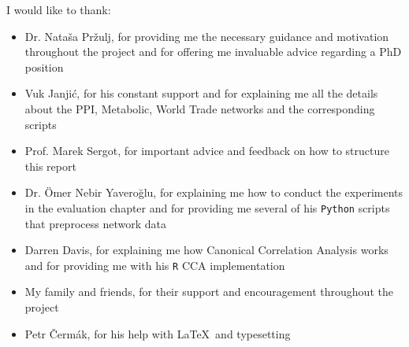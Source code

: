 \documentclass[11pt,a4paper,oneside]{book}
\theoremstyle{definition}
\theoremstyle{definition}
\theoremstyle{definition}
\newcommand{\MainPageStyle}{\pagestyle{main}}
\begin{document}
I would like to thank:
\begin{itemize}
 \item Dr. Nata\v{s}a Pr\v{z}ulj, for providing me the necessary guidance and motivation throughout the project and for offering me invaluable advice regarding a PhD position
 \item Vuk Janji\'{c}, for his constant support and for explaining me all the details about the PPI, Metabolic, World Trade networks and the corresponding scripts
 \item Prof. Marek Sergot, for important advice and feedback on how to structure this report
 \item Dr. \"{O}mer Nebir Yavero\u{g}lu, for explaining me how to conduct the experiments in the evaluation chapter and for providing me several of his \lstinline|Python| scripts that preprocess network data
 \item Darren Davis, for explaining me how Canonical Correlation Analysis works and for providing me with his \lstinline|R| CCA implementation
 \item My family and friends, for their support and encouragement throughout the project
 \item Petr \v{C}erm\'{a}k, for his help with \LaTeX\ and typesetting
\end{itemize}

\clearpage

\cleardoublepage{}
\MainPageStyle{}

\tableofcontents

\listoffigures
















\nocite{*} %





\appendix

\end{document}

